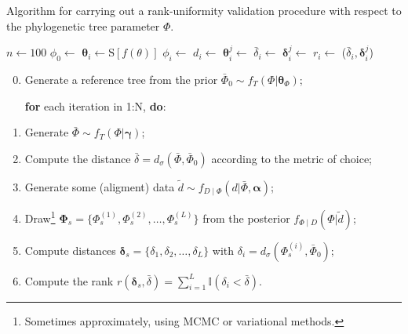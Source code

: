\documentclass[oneside]{article}
\begin{document}
\begin{algorithm}[h]
  \DontPrintSemicolon
  \caption{Algorithm for carrying out a rank-uniformity validation procedure with respect to the phylogenetic tree parameter $\Phi$.}
  \label{alg:sbcphylo}
  $n \gets 100$\; 
  $\phi_0 \gets$ \SampleTree{$\theta_\Phi$}\; 
   {
    $\boldsymbol{\theta}_i \gets \text{S}[f(\theta)]$\; 
    $\phi_i \gets$ \; 
    $d_i \gets$ \; 
    $\boldsymbol{\theta}_i^j \gets$ \; 
    $\bar{\delta}_i \gets$ \; 
    $\boldsymbol{\delta}_i^j \gets$ \; 
    $r_i \gets$ \Rank($\bar{\delta}_i, \boldsymbol{\delta}_i^j$)\; 
  }
  \label{alg:sbc}
\end{algorithm}


  \begin{enumerate}
    \setcounter{enumi}{-1}

  \item Generate a reference tree from the prior $\bar{\Phi}_0  \sim f_T(\Phi | \boldsymbol \theta_\Phi)$; 

    \textbf{for} each iteration in 1:N, \textbf{do}:
    
  \item Generate $\bar{\Phi} \sim f_T(\Phi | \boldsymbol \gamma)$;
  \item Compute the distance $\bar{\delta} = d_\sigma(\bar{\Phi},\bar{\Phi}_0)$ according to the metric of choice;
  \item Generate some (aligment) data $\tilde{d} \sim f_{D\mid\Phi}(d | \bar{\Phi}, \boldsymbol\alpha)$;
  \item Draw\footnote{Sometimes approximately, using MCMC or variational methods.} $\boldsymbol \Phi_s = \{\Phi_s^{(1)}, \Phi_s^{(2)}, \ldots, \Phi_s^{(L)}\}$ from the posterior $f_{\Phi\mid D}(\Phi | \tilde{d})$;
  \item Compute distances $\boldsymbol \delta_s = \{ \delta_1, \delta_2, \ldots, \delta_L \}$  with $\delta_i = d_\sigma(\Phi_s^{(i)}, \bar{\Phi}_0)$;
  \item Compute the rank $r(\boldsymbol\delta_s, \bar{\delta}) = \sum\limits_{i=1}^L \mathbb{I}(\delta_i < \bar{\delta})$.
  \end{enumerate}
\end{document}
